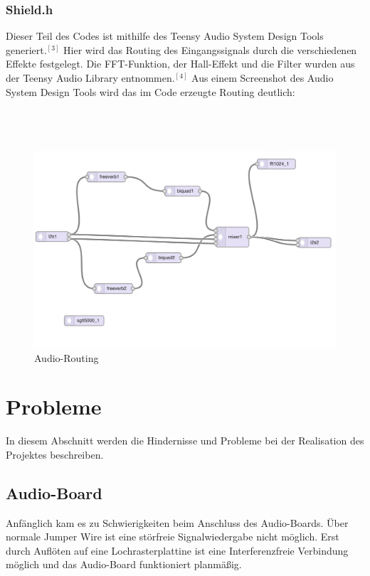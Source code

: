 \documentclass[12pt]{article}
\begin{document}
\subsubsection{Shield.h}
Dieser Teil des Codes ist mithilfe des Teensy Audio System Design Tools generiert.$^{[3]}$ Hier wird das Routing des Eingangssignals durch die verschiedenen Effekte festgelegt. 
Die FFT-Funktion, der Hall-Effekt und die Filter wurden aus der Teensy Audio Library entnommen.$^{[4]}$
Aus einem Screenshot des Audio System Design Tools wird das im Code erzeugte Routing deutlich:
\\
\\
\\
\\
\begin{figure}[h]
  \centering
  \includegraphics[width=\textwidth]{AudioDesignTool}
  \caption{Audio-Routing}
\end{figure}
\newpage
\section{Probleme}
In diesem Abschnitt werden die Hindernisse und Probleme bei der Realisation des Projektes beschreiben.
\subsection{Audio-Board}
Anfänglich kam es zu Schwierigkeiten beim Anschluss des Audio-Boards. Über normale Jumper Wire ist eine störfreie Signalwiedergabe nicht möglich. 
Erst durch Auflöten auf eine Lochrasterplattine ist eine Interferenzfreie Verbindung möglich und das Audio-Board funktioniert planmäßig.
\end{document}
